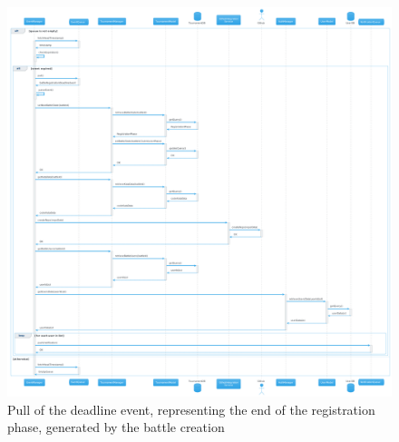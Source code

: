 \begin{figure}[H]
    \hspace{-1.5cm}
    \includegraphics[width=1.2\textwidth]{Diagrams/sequence/create_battle_pull_deadline_registration.png}
    \caption{Pull of the deadline event, representing the end of the registration phase, generated by the battle creation}
\end{figure}
